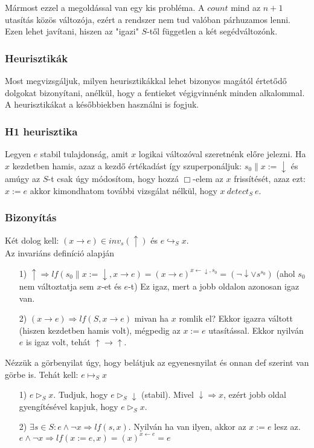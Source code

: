 \documentclass{article}
\newcommand{\false}{\downarrow}
\newcommand{\true}{\uparrow}
\newcommand{\pp}{\parallel}
\begin{document}
Mármost ezzel a megoldással van egy kis probléma. A $count$ mind az $n+1$ utasítás közös változója, ezért a rendszer
nem tud valóban párhuzamos lenni. Ezen lehet javítani, hiszen az "igazi" $S$-től független a két segédváltozónk.
\subsubsection*{Heurisztikák}
Most megvizsgáljuk, milyen heurisztikákkal lehet bizonyos magától értetődő dolgokat bizonyítani, anélkül, hogy a fentieket végigvinnénk minden alkalommal. A heurisztikákat a későbbiekben használni is fogjuk.
\subsubsection*{H1 heurisztika}
Legyen $e$ stabil tulajdonság, amit $x$ logikai változóval szeretnénk előre jelezni. Ha $x$ kezdetben hamis, azaz a kezdő értékadást így szuperponáljuk: $s_0 \pp x:= \false$ és amúgy az $S$-t csak úgy módosítom, hogy hozzá $\Box$-elem az $x$ frissítését, azaz ezt: $x:=e$ akkor kimondhatom további vizsgálat nélkül, hogy $x\ detect_S\ e$.
\subsubsection*{Bizonyítás}
Két dolog kell: $(x \rightarrow e) \in inv_s(\true)$ és $e \hookrightarrow_S x$.
\\
Az invariáns definíció alapján
\begin{enumerate}
\item[1)]$\true \Rightarrow lf(s_0 \pp x:= \false, x\rightarrow e) = (x \rightarrow e)^{x \leftarrow \false, s_0} = (\neg \false \lor s^{s_0})$ (ahol $s_0$ nem változtatja sem $x$-et és $e$-t) Ez igaz, mert a jobb oldalon azonosan igaz van.
\item[2)]$(x \rightarrow e) \Rightarrow lf(S,x \rightarrow e)$ mivan ha $x$ romlik el? Ekkor igazra váltott (hiszen kezdetben hamis volt), mégpedig az $x:=e$ utasítással. Ekkor nyilván $e$ is igaz volt, tehát $\true \rightarrow \true$.
\end{enumerate}
Nézzük a görbenyilat úgy, hogy belátjuk az egyenesnyilat és onnan def szerint van görbe is.
Tehát kell: $e \mapsto_S x$
\begin{enumerate}
\item[1)]$e \triangleright_S x$. Tudjuk, hogy $e \triangleright_S \false$ (stabil). Mivel $\false \Rightarrow x$, ezért jobb oldal gyengítésével kapjuk, hogy $e \triangleright_S x$. \checkmark
\item[2)]$\exists s \in S:e \land \neg x \Rightarrow lf(s,x)$. Nyilván ha van ilyen, akkor az $x:=e$ lesz az. $e \land \neg x \Rightarrow lf(x:=e,x) = (x)^{x\leftarrow e} =e$ \checkmark
\end{enumerate}
\end{document}
